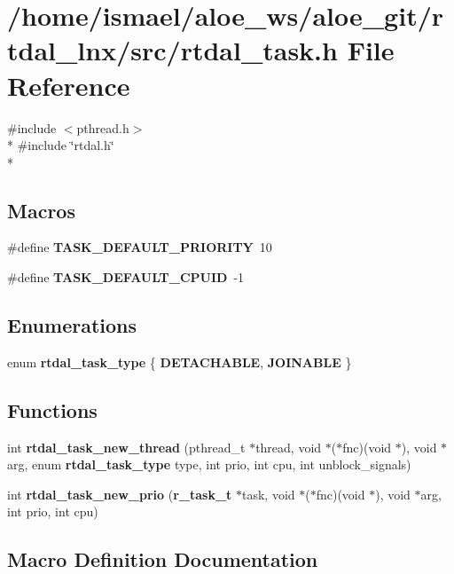 \section{/home/ismael/aloe\-\_\-ws/aloe\-\_\-git/rtdal\-\_\-lnx/src/rtdal\-\_\-task.h File Reference}
\label{rtdal__task_8h}
{\ttfamily \#include $<$pthread.\-h$>$}\\*
{\ttfamily \#include \char`\"{}rtdal.\-h\char`\"{}}\\*
\subsection*{Macros}
\begin{DoxyCompactItemize}
\item 
\#define {\bf T\-A\-S\-K\-\_\-\-D\-E\-F\-A\-U\-L\-T\-\_\-\-P\-R\-I\-O\-R\-I\-T\-Y}~10
\item 
\#define {\bf T\-A\-S\-K\-\_\-\-D\-E\-F\-A\-U\-L\-T\-\_\-\-C\-P\-U\-I\-D}~-\/1
\end{DoxyCompactItemize}
\subsection*{Enumerations}
\begin{DoxyCompactItemize}
\item 
enum {\bf rtdal\-\_\-task\-\_\-type} \{ {\bf D\-E\-T\-A\-C\-H\-A\-B\-L\-E}, 
{\bf J\-O\-I\-N\-A\-B\-L\-E}
 \}
\end{DoxyCompactItemize}
\subsection*{Functions}
\begin{DoxyCompactItemize}
\item 
int {\bf rtdal\-\_\-task\-\_\-new\-\_\-thread} (pthread\-\_\-t $\ast$thread, void $\ast$($\ast$fnc)(void $\ast$), void $\ast$arg, enum {\bf rtdal\-\_\-task\-\_\-type} type, int prio, int cpu, int unblock\-\_\-signals)
\item 
int {\bf rtdal\-\_\-task\-\_\-new\-\_\-prio} ({\bf r\-\_\-task\-\_\-t} $\ast$task, void $\ast$($\ast$fnc)(void $\ast$), void $\ast$arg, int prio, int cpu)
\end{DoxyCompactItemize}


\subsection{Macro Definition Documentation}

